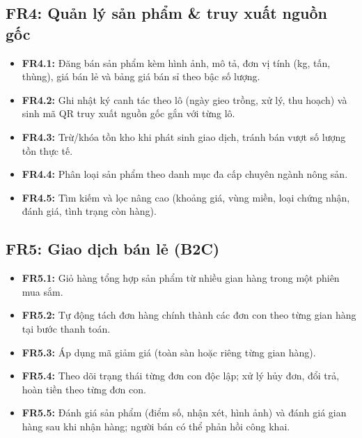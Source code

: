 \subsection{FR4: Quản lý sản phẩm \& truy xuất nguồn gốc}
\begin{itemize}
    \item \textbf{FR4.1:} Đăng bán sản phẩm kèm hình ảnh, mô tả, đơn vị
    tính (kg, tấn, thùng), giá bán lẻ và bảng giá bán sỉ theo bậc số lượng.
    \item \textbf{FR4.2:} Ghi nhật ký canh tác theo lô (ngày gieo trồng, xử
    lý, thu hoạch) và sinh mã QR truy xuất nguồn gốc gắn với từng lô.
    \item \textbf{FR4.3:} Trừ/khóa tồn kho khi phát sinh giao dịch, tránh
    bán vượt số lượng tồn thực tế.
    \item \textbf{FR4.4:} Phân loại sản phẩm theo danh mục đa cấp chuyên
    ngành nông sản.
    \item \textbf{FR4.5:} Tìm kiếm và lọc nâng cao (khoảng giá, vùng miền,
    loại chứng nhận, đánh giá, tình trạng còn hàng).
\end{itemize}

\subsection{FR5: Giao dịch bán lẻ (B2C)}
\begin{itemize}
    \item \textbf{FR5.1:} Giỏ hàng tổng hợp sản phẩm từ nhiều gian hàng
    trong một phiên mua sắm.
    \item \textbf{FR5.2:} Tự động tách đơn hàng chính thành các đơn con
    theo từng gian hàng tại bước thanh toán.
    \item \textbf{FR5.3:} Áp dụng mã giảm giá (toàn sàn hoặc riêng từng
    gian hàng).
    \item \textbf{FR5.4:} Theo dõi trạng thái từng đơn con độc lập; xử lý
    hủy đơn, đổi trả, hoàn tiền theo từng đơn con.
    \item \textbf{FR5.5:} Đánh giá sản phẩm (điểm số, nhận xét, hình ảnh)
    và đánh giá gian hàng sau khi nhận hàng; người bán có thể phản hồi công
    khai.
\end{itemize}


